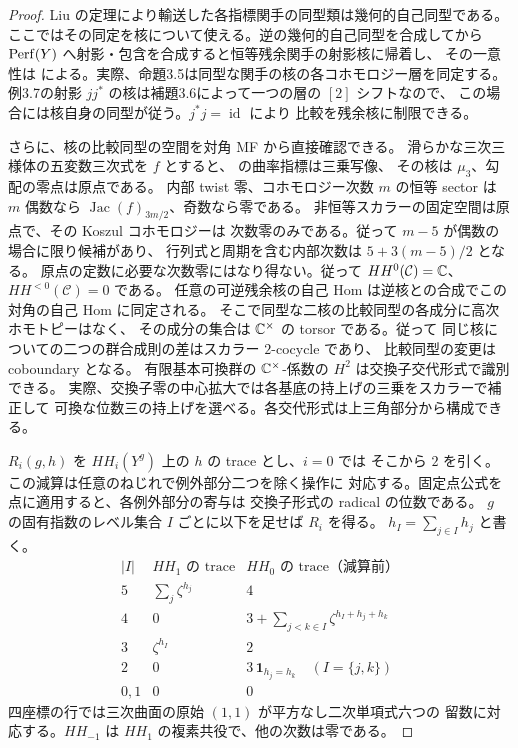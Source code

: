 \begin{proof}
Liu の定理により輸送した各指標関手の同型類は幾何的自己同型である。
ここではその同定を核について使える。逆の幾何的自己同型を合成してから
$\operatorname{Perf}(Y)$ へ射影・包含を合成すると恒等残余関手の射影核に帰着し、
その一意性は \cite[Proposition~3.5, Lemma~3.6, Example~3.7]{NFMLiuCubicThreefoldAut}
による。実際、命題3.5は同型な関手の核の各コホモロジー層を同定する。
例3.7の射影 $j j^*$ の核は補題3.6によって一つの層の $[2]$ シフトなので、
この場合には核自身の同型が従う。$j^*j=\operatorname{id}$ により
比較を残余核に制限できる。

さらに、核の比較同型の空間を対角 MF から直接確認できる。
滑らかな三次三様体の五変数三次式を $f$ とすると、
\cite[Theorem~5.39 and proof]{NFBFKKernels}の曲率指標は三乗写像、
その核は $\mu_3$、勾配の零点は原点である。
内部 twist 零、コホモロジー次数 $m$ の恒等 sector は
$m$ 偶数なら $\operatorname{Jac}(f)_{3m/2}$、奇数なら零である。
非恒等スカラーの固定空間は原点で、その Koszul コホモロジーは
次数零のみである。従って $m-5$ が偶数の場合に限り候補があり、
行列式と周期を含む内部次数は $5+3(m-5)/2$ となる。
原点の定数に必要な次数零にはなり得ない。従って
$HH^0(\mathcal C)=\mathbb C$、$HH^{<0}(\mathcal C)=0$ である。
任意の可逆残余核の自己 Hom は逆核との合成でこの対角の自己 Hom に同定される。
そこで同型な二核の比較同型の各成分に高次ホモトピーはなく、
その成分の集合は $\mathbb C^\times$ の torsor である。従って
同じ核についての二つの群合成則の差はスカラー $2$-cocycle であり、
比較同型の変更は coboundary となる。
有限基本可換群の $\mathbb C^\times$-係数の $H^2$ は交換子交代形式で識別できる。
実際、交換子零の中心拡大では各基底の持上げの三乗をスカラーで補正して
可換な位数三の持上げを選べる。各交代形式は上三角部分から構成できる。

$R_i(g,h)$ を $HH_i(Y^g)$ 上の $h$ の trace とし、$i=0$ では
そこから $2$ を引く。この減算は任意のねじれで例外部分二つを除く操作に
対応する。固定点公式を点に適用すると、各例外部分の寄与は
交換子形式の radical の位数である。
$g$ の固有指数のレベル集合 $I$ ごとに以下を足せば $R_i$ を得る。
$h_I=\sum_{j\in I}h_j$ と書く。
\[
\begin{array}{c|c|c}
 |I| & HH_1\text{ の trace}&HH_0\text{ の trace（減算前）}\\\hline
5&\sum_j\zeta^{h_j}&4\\
4&0&3+\sum_{j<k\in I}\zeta^{h_I+h_j+h_k}\\
3&\zeta^{h_I}&2\\
2&0&3\,\mathbf1_{h_j=h_k}\quad(I=\{j,k\})\\
0,1&0&0
\end{array}
\]
四座標の行では三次曲面の原始 $(1,1)$ が平方なし二次単項式六つの
留数に対応する。$HH_{-1}$ は $HH_1$ の複素共役で、他の次数は零である。


\end{proof}
